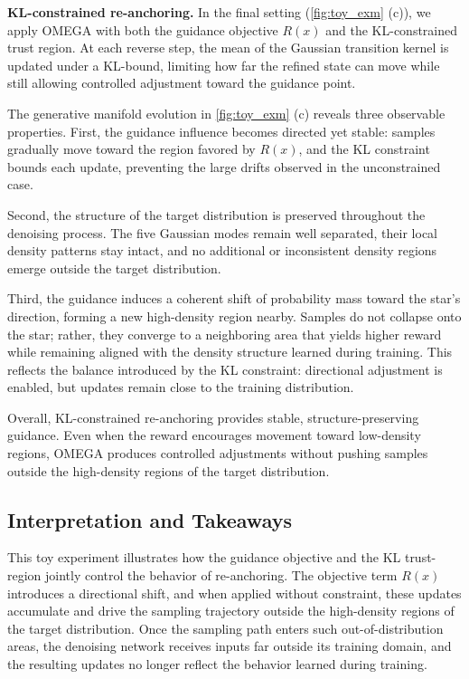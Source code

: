 \documentclass[10pt,twocolumn,letterpaper]{article}
\theoremstyle{plain}
\theoremstyle{remark}
\renewcommand{\paragraph}[1]{\vspace{.5em}\noindent\textbf{#1.}}
\begin{document}
\paragraph{KL-constrained re-anchoring}
In the final setting (\cref{fig:toy_exm} (c)), we apply OMEGA with both the guidance objective $R(x)$ and the KL-constrained trust region. At each reverse step, the mean of the Gaussian transition kernel is updated under a KL-bound, limiting how far the refined state can move while still allowing controlled adjustment toward the guidance point.

The generative manifold evolution in \cref{fig:toy_exm} (c) reveals three observable properties.
First, the guidance influence becomes directed yet stable: samples gradually move toward the region favored by $R(x)$, and the KL constraint bounds each update, preventing the large drifts observed in the unconstrained case.

Second, the structure of the target distribution is preserved throughout the denoising process. The five Gaussian modes remain well separated, their local density patterns stay intact, and no additional or inconsistent density regions emerge outside the target distribution.

Third, the guidance induces a coherent shift of probability mass toward the star’s direction, forming a new high-density region nearby. Samples do not collapse onto the star; rather, they converge to a neighboring area that yields higher reward while remaining aligned with the density structure learned during training. This reflects the balance introduced by the KL constraint: directional adjustment is enabled, but updates remain close to the training distribution.

Overall, KL-constrained re-anchoring provides stable, structure-preserving guidance. Even when the reward encourages movement toward low-density regions, OMEGA produces controlled adjustments without pushing samples outside the high-density regions of the target distribution.


\subsection{Interpretation and Takeaways}

This toy experiment illustrates how the guidance objective and the KL trust-region jointly control the behavior of re-anchoring. The objective term $R(x)$ introduces a directional shift, and when applied without constraint, these updates accumulate and drive the sampling trajectory outside the high-density regions of the target distribution. Once the sampling path enters such out-of-distribution areas, the denoising network receives inputs far outside its training domain, and the resulting updates no longer reflect the behavior learned during training.
\end{document}
